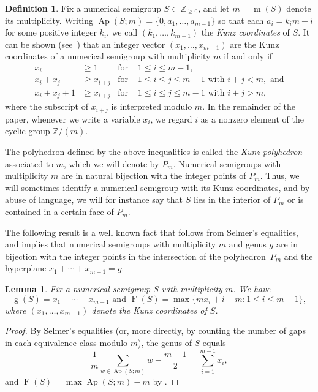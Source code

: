 \documentclass[12pt]{amsart}
\newtheorem{lemma}[thm]{Lemma}
\theoremstyle{definition}
\newtheorem{defn}[thm]{Definition}
\numberwithin{equation}{section}
\newcommand{\ring}[1]{\ensuremath{\mathbb{#1}}}
\renewcommand\>{\rangle}
\newcommand\<{\langle}
\newcommand\0{\mathbf{0}}
\newcommand\ZZ{\ring{Z}}
\DeclareMathOperator\Ap{Ap} %
\begin{document}
\begin{defn}\label{d:kunzpolyhedron}
Fix a numerical semigroup $S \subset \ZZ_{\ge 0}$, and let $m = \operatorname{m}(S)$ denote its multiplicity.  Writing $\Ap(S;m) = \{0, a_1,\ldots, a_{m-1}\}$ so that each $a_i = k_im + i$ for some positive integer $k_i$, we call $(k_1, \ldots, k_{m-1})$ the \emph{Kunz coordinates} of $S$.  It can be shown (see~\cite{kunz-coordinates}) that an integer vector $(x_1, \ldots, x_{m-1})$ are the Kunz coordinates of a numerical semigroup with multiplicity $m$ if and only if 
\begin{align*}
x_i           & \ge 1         & \text{for } & 1 \le i \le m-1,
\\
x_i + x_j     & \ge x_{i+j}   & \text{for } & 1 \le i \le j \le m-1 \text{ with } i + j < m, \text{ and}
\\
x_i + x_j + 1 & \ge x_{i+j} & \text{for } & 1 \le i \le j \le m-1 \text{ with } i + j > m,
\end{align*}
where the subscript of $x_{i+j}$ is interpreted modulo $m$.  In the remainder of the paper, whenever we write a variable $x_i$, we regard $i$ as a nonzero element of the cyclic group $\ZZ/(m)$.  

The polyhedron defined by the above inequalities is called the \emph{Kunz polyhedron} associated to $m$, which we will denote by $P_m$.  Numerical semigroups with multiplicity $m$ are in natural bijection with the integer points of $P_m$. Thus, we will sometimes identify a numerical semigroup with its Kunz coordinates, and by abuse of language, we will for instance say that $S$ lies in the interior of $P_m$ or is contained in a certain face of $P_m$.
\end{defn}

The following result is a well known fact that follows from Selmer's equalities, and implies that numerical semigroups with multiplicity $m$ and genus $g$ are in bijection with the integer points in the intersection of the polyhedron~$P_m$ and the hyperplane $x_1 + \cdots + x_{m-1} = g$.

\begin{lemma}\label{l:genusandfrob}
Fix a numerical semigroup $S$ with multiplicity $m$.  We have
\[
\operatorname{g}(S) = x_1 + \cdots + x_{m-1}  \text{ and }  \operatorname{F}(S) = \max\{mx_i + i - m : 1 \le i \le m - 1\},
\]
where $(x_1,\ldots,x_{m-1})$ denote the Kunz coordinates of $S$.  
\end{lemma}
\begin{proof}
By Selmer's equalities \cite{selmer} (or, more directly, by counting the number of gaps in each equivalence class modulo $m$), the genus of $S$ equals 
\[\frac{1}{m}\sum_{w\in \Ap(S;m)}w-\frac{m-1}2=\sum_{i=1}^{m-1}x_i,\]
and $\operatorname{F}(S)=\max\Ap(S;m)-m$ by \cite[Proposition 2.12]{numerical}.
\end{proof}
\end{document}
